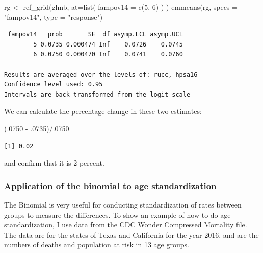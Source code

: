 \documentclass[
  letterpaper,
  DIV=11,
  numbers=noendperiod]{scrreprt}
\newenvironment{Shaded}{\begin{snugshade}}{\end{snugshade}}
\newcommand{\AttributeTok}[1]{\textcolor[rgb]{0.40,0.45,0.13}{#1}}
\newcommand{\DecValTok}[1]{\textcolor[rgb]{0.68,0.00,0.00}{#1}}
\newcommand{\FunctionTok}[1]{\textcolor[rgb]{0.28,0.35,0.67}{#1}}
\newcommand{\NormalTok}[1]{\textcolor[rgb]{0.00,0.23,0.31}{#1}}
\newcommand{\OtherTok}[1]{\textcolor[rgb]{0.00,0.23,0.31}{#1}}
\newcommand{\SpecialCharTok}[1]{\textcolor[rgb]{0.37,0.37,0.37}{#1}}
\newcommand{\StringTok}[1]{\textcolor[rgb]{0.13,0.47,0.30}{#1}}
\begin{document}
\begin{Shaded}
\begin{Highlighting}[]
\NormalTok{rg }\OtherTok{\textless{}{-}} \FunctionTok{ref\_grid}\NormalTok{(glmb,}
               \AttributeTok{at=}\FunctionTok{list}\NormalTok{( }\AttributeTok{fampov14 =} \FunctionTok{c}\NormalTok{(}\DecValTok{5}\NormalTok{, }\DecValTok{6}\NormalTok{) ) ) }
\FunctionTok{emmeans}\NormalTok{(rg,}
        \AttributeTok{specs =} \StringTok{"fampov14"}\NormalTok{,}
        \AttributeTok{type =} \StringTok{"response"}\NormalTok{)}
\end{Highlighting}
\end{Shaded}

\begin{verbatim}
 fampov14   prob       SE  df asymp.LCL asymp.UCL
        5 0.0735 0.000474 Inf    0.0726    0.0745
        6 0.0750 0.000470 Inf    0.0741    0.0760

Results are averaged over the levels of: rucc, hpsa16 
Confidence level used: 0.95 
Intervals are back-transformed from the logit scale 
\end{verbatim}

We can calculate the percentage change in these two estimates:

\begin{Shaded}
\begin{Highlighting}[]
\NormalTok{(.}\DecValTok{0750} \SpecialCharTok{{-}}\NormalTok{ .}\DecValTok{0735}\NormalTok{)}\SpecialCharTok{/}\NormalTok{.}\DecValTok{0750}
\end{Highlighting}
\end{Shaded}

\begin{verbatim}
[1] 0.02
\end{verbatim}

and confirm that it is 2 percent.

\hypertarget{application-of-the-binomial-to-age-standardization}{%
\subsubsection{Application of the binomial to age
standardization}\label{application-of-the-binomial-to-age-standardization}}

The Binomial is very useful for conducting standardization of rates
between groups to measure the differences. To show an example of how to
do age standardization, I use data from the
\href{https://wonder.cdc.gov/mortSQL.html}{CDC Wonder Compressed
Mortality file}. The data are for the states of Texas and California for
the year 2016, and are the numbers of deaths and population at risk in
13 age groups.
\end{document}
